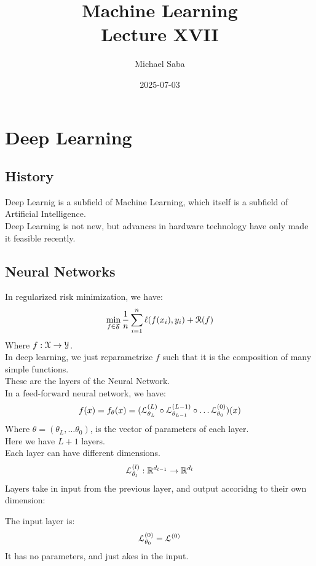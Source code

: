 \documentclass[12pt]{article}
\title{%
    \Huge Machine Learning \\
    \Large Lecture XVII
}
\date{2025-07-03}
\author{Michael Saba}
\begin{document}
\maketitle
\newpage
\setlength{\parindent}{0pt}

\section*{Deep Learning}
\subsection*{History}

Deep Learnig is a subfield of Machine Learning,
which itself is a subfield of Artificial Intelligence. \\

Deep Learning is not new, but advances in hardware
technology have only made it feasible recently. \\

\newpage

\subsection*{Neural Networks}

In regularized risk minimization, we have:
\[ \min_{f \in \mathfrak{F}} \dfrac{1}{n}
\sum_{i=1}^n \ell(f(x_i), y_i) + \mathcal{R}(f) \]
Where $f: \mathcal{X} \to \mathcal{Y}$. \\

In deep learning, we just reparametrize $f$
such that it is the composition of many simple
functions. \\
These are the layers of the Neural Network. \\

In a feed-forward neural network, we have:
\[ f(x) = f_\theta(x) = (\mathcal{L}_{\theta_L}^{(L)}
\circ \mathcal{L}_{\theta_{L-1}}^{(L-1)} \circ \dots 
\mathcal{L}_{\theta_0}^{(0)} )(x)  \]
Where $\theta = (\theta_L, \dots \theta_0)$,
is the vector of parameters of each layer. \\
Here we have $L+1$ layers. \\

Each layer can have different dimensions.
\[ \mathcal{L}_{\theta_l}^{(l)}: \mathbb{R}^{d_{l-1}} \to \mathbb{R}^{d_l} \]
Layers take in input from the previous layer,
and output accoridng to their own dimension:

The input layer is:
\[\mathcal{L}_{\theta_0}^{(0)} = \mathcal{L}^{(0)} \]
It has no parameters, and just akes in the input. \\
\end{document}
